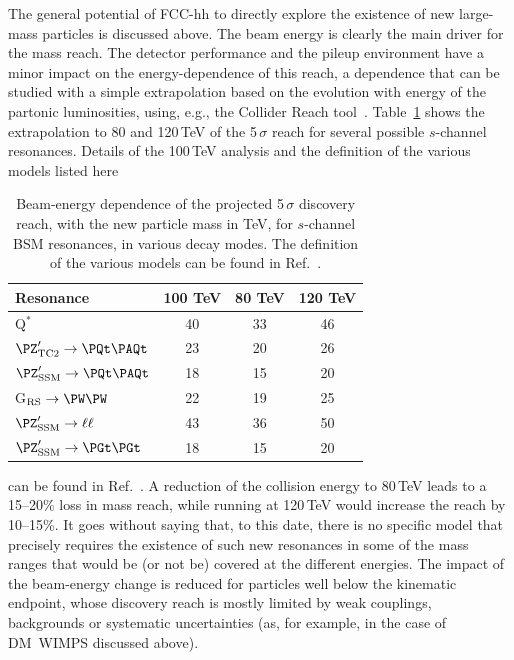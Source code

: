 The general potential of FCC-hh to directly explore the existence of new large-mass particles is discussed above. 
The beam energy is clearly the main driver for the mass reach. 
The detector performance and the pileup environment have a minor impact on the energy-dependence of this reach, 
a dependence that can be studied with a simple extrapolation based on the evolution with energy of the partonic luminosities, 
using, e.g., the Collider Reach tool~\cite{ColliderReach}.  
Table~\ref{tab:FCChh_sce_res} shows the extrapolation to 80 and 120\,TeV of the 5\,$\sigma$ reach 
for several possible $s$-channel resonances.
Details of the 100\,TeV analysis and the definition of the various models listed here
%
\begin{table}[ht]
\centering
\caption{Beam-energy dependence of the projected 5\,$\sigma$ discovery reach, 
with the new particle mass in TeV, for $s$-channel BSM resonances, in various decay modes. 
The definition of the various models can be found in Ref.~\cite{Helsens:2019bfw}.}
\label{tab:FCChh_sce_res}
\begin{tabular}{ l   c   c  c }
\toprule
Resonance & 100 TeV 
& 80 TeV & 120 TeV \\ 
\midrule 
Q$^*$ & 40 & 33 & 46 \\
$\PZ^\prime_\mathrm{TC2} \to \ttbar$ & 23 & 20 & 26 \\
$\PZ^\prime_\mathrm{SSM} \to \ttbar$ & 18 & 15 & 20 \\
G$_\mathrm{RS}\to \PW\PW$ & 22 & 19 & 25 \\
$\PZ^\prime_\mathrm{SSM}\to \ell\ell$ & 43 & 36 & 50 \\
$\PZ^\prime_\mathrm{SSM}\to \PGt\PGt$ & 18 & 15 & 20 \\
\bottomrule
\end{tabular}
\end{table}
%
can be found in Ref.~\cite{Helsens:2019bfw}. 
A reduction of the collision energy to 80\,TeV leads to a 15--20\% loss in mass reach, 
while running at 120\,TeV would increase the reach by 10--15\%. 
It goes without saying that, to this date, 
there is no specific model that precisely requires the existence of such new resonances in 
some of the mass ranges that would be (or not be) covered at the different energies. 
The impact of the beam-energy change is reduced for particles well below the kinematic endpoint, 
whose discovery reach is mostly limited by weak couplings, backgrounds or systematic uncertainties 
(as, for example, in the case of DM~WIMPS discussed above). 

